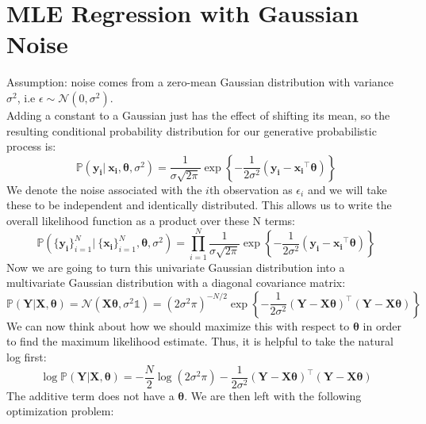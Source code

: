 \documentclass[twoside]{article}
\begin{document}
\section{MLE Regression with Gaussian Noise}
Assumption: noise comes from a zero-mean Gaussian distribution with variance $\sigma^2$, i.e $\epsilon \sim \mathcal{N}(0, \sigma^2)$.\\
Adding a constant to a Gaussian just has the effect of shifting its mean, so the resulting conditional
probability distribution for our generative probabilistic process is:
\begin{equation*}
    \mathbb{P}(\boldsymbol{y_i} | \: \boldsymbol{x_i}, \boldsymbol{\theta}, \sigma^2) = \frac{1}{\sigma\sqrt{2\pi}}\exp{\left \{-\frac{1}{2\sigma^2}(\boldsymbol{y_i} - \boldsymbol{x_i}^{\intercal}\boldsymbol{\theta})\right\}}
\end{equation*}
We denote the noise associated with the $i$th observation as $\epsilon_i$ and we will take these to be independent and identically distributed. This allows us to write the overall likelihood function as a product over these N terms:
\begin{equation*}
    \mathbb{P}(\{\boldsymbol{y_i}\}_{i = 1}^N | \: \{\boldsymbol{x_i}\}_{i = 1}^N, \boldsymbol{\theta}, \sigma^2) = \prod\limits_{i = 1}^N\frac{1}{\sigma\sqrt{2\pi}}\exp{\left \{-\frac{1}{2\sigma^2}(\boldsymbol{y_i} - \boldsymbol{x_i}^{\intercal}\boldsymbol{\theta})\right\}}
\end{equation*}
Now we are going to turn this univariate Gaussian distribution into a multivariate Gaussian distribution with a diagonal covariance matrix:
\begin{equation*}
    \mathbb{P}(\boldsymbol{Y}|\boldsymbol{X},\boldsymbol{\theta}) = \mathcal{N}(\boldsymbol{X}\boldsymbol{\theta}, \sigma^2\mathds{1}) = (2\sigma^2\pi)^{-N / 2}\exp{\left\{ -\frac{1}{2\sigma^2}(\boldsymbol{Y} - \boldsymbol{X\theta})^{\intercal}(\boldsymbol{Y} - \boldsymbol{X\theta}) \right\}}
\end{equation*}
We can now think about how we should maximize this with respect to $\boldsymbol{\theta}$ in order to find the maximum
likelihood estimate. Thus, it is helpful to take the natural log first:
\begin{equation*}
    \log\mathbb{P}(\boldsymbol{Y}|\boldsymbol{X},\boldsymbol{\theta}) = -\frac{N}{2}\log(2\sigma^2\pi) -\frac{1}{2\sigma^2}(\boldsymbol{Y} - \boldsymbol{X\theta})^{\intercal}(\boldsymbol{Y} - \boldsymbol{X\theta})
\end{equation*}
The additive term does not have a $\boldsymbol{\theta}$. We are then left with the following optimization problem:
\end{document}
